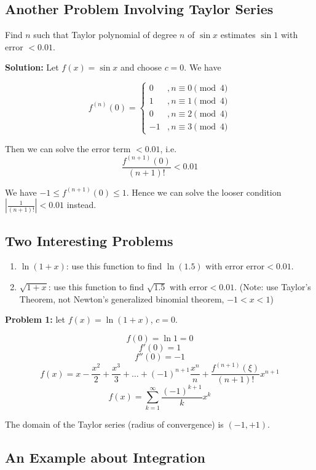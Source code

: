 \subsection{Another Problem Involving Taylor Series}

Find $n$ such that Taylor polynomial of degree $n$ of $\sin x$ estimates $\sin 1$ with error $< 0.01$.

\textbf{Solution:} Let $f(x) = \sin x$ and choose $c = 0$. We have

$$ f^{(n)}(0) = \begin{cases}
  0 & , n \equiv 0 \pmod{4}\\
  1 & , n \equiv 1 \pmod{4}\\
  0 & , n \equiv 2 \pmod{4}\\
  -1 & , n \equiv 3 \pmod{4}
\end{cases} $$

Then we can solve the error term $< 0.01$, i.e. $$ \frac{f^{(n+1)}(0)}{(n + 1)!} < 0.01 $$

We have $ -1 \leq f^{(n+1)}(0) \leq 1 $. Hence we can solve the looser condition $ |\frac{1}{(n+1)!}| < 0.01 $ instead.

\subsection{Two Interesting Problems}

\begin{enumerate}
  \item $\ln (1+x)$: use this function to find $\ln (1.5)$ with error $\text{error} < 0.01$.
  \item $\sqrt{1+x}$: use this function to find $\sqrt{1.5}$ with $\text{error} < 0.01$. (Note: use Taylor's Theorem, not Newton's generalized binomial theorem, $-1 < x < 1$)
\end{enumerate}

\textbf{Problem 1:} let $f(x) = \ln(1 + x)$, $c = 0$.

$$ f(0) = \ln 1 = 0 $$
$$ f'(0) = 1 $$
$$ f''(0) = -1 $$
$$ f(x) = x - \frac{x^2}{2} + \frac{x^3}{3} + \dots + (-1)^{n+1} \frac{x^n}{n} + \frac{f^{(n+1)}(\xi)}{(n+1)!} x^{n+1} $$
$$ f(x) = \sum_{k=1}^\infty \frac{(-1)^{k+1}}{k} x^k $$

The domain of the Taylor series (radius of convergence) is $ (-1, +1) $.

\subsection{An Example about Integration}

